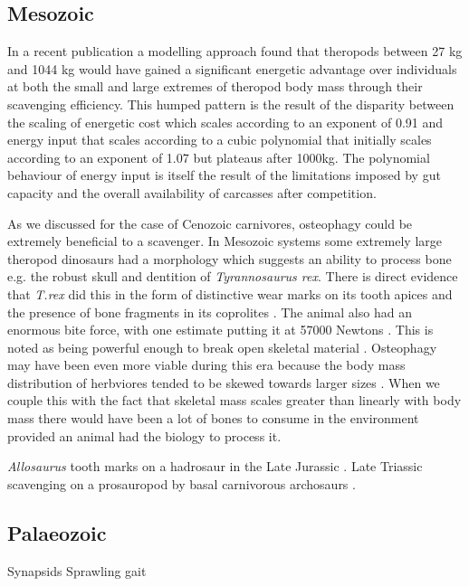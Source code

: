 \documentclass[a4paper,12pt]{article}
\begin{document}
\subsection*{Mesozoic}
In a recent publication a modelling approach found that theropods between 27 kg and 1044 kg would have gained a significant energetic advantage over individuals at both the small and large extremes of theropod body mass through their scavenging efficiency. 
This humped pattern is the result of the disparity between the scaling of energetic cost which scales according to an exponent of 0.91 and energy input that scales according to a cubic polynomial that initially scales according to an exponent of 1.07 but plateaus after 1000kg. 
The polynomial behaviour of energy input is itself the result of the limitations imposed by gut capacity and the overall availability of carcasses after competition.

As we discussed for the case of Cenozoic carnivores, osteophagy could be extremely beneficial to a scavenger. 
In Mesozoic systems some extremely large theropod dinosaurs had a morphology which suggests an ability to process bone e.g. the robust skull and dentition of \textit{Tyrannosaurus rex}. 
There is direct evidence that \textit{T.rex} did this in the form of distinctive wear marks on its tooth apices \citep{farlow1994wear,schubert2005wear} and the presence of bone fragments in its coprolites \citep{chin1998king}. 
The animal also had an enormous bite force, with one estimate putting it at 57000 Newtons \citep{bates2012estimating}. 
This is noted as being powerful enough to break open skeletal material \citep{rayfield2001cranial}. 
Osteophagy may have been even more viable during this era because the body mass distribution of herbviores tended to be skewed towards larger sizes \citep{10.1371/journal.pone.0051925}. 
When we couple this with the fact that skeletal mass scales greater than linearly with body mass \citep{prange1979scaling} there would have been a lot of bones to consume in the environment provided an animal had the biology to process it. 


\textit{Allosaurus} tooth marks on a hadrosaur in the Late Jurassic \citep{chure1997one}. 
Late Triassic scavenging on a prosauropod by basal carnivorous archosaurs \citep{hungerbuhler1998taphonomy}.

\subsection*{Palaeozoic}
Synapsids 
Sprawling gait
\end{document}
